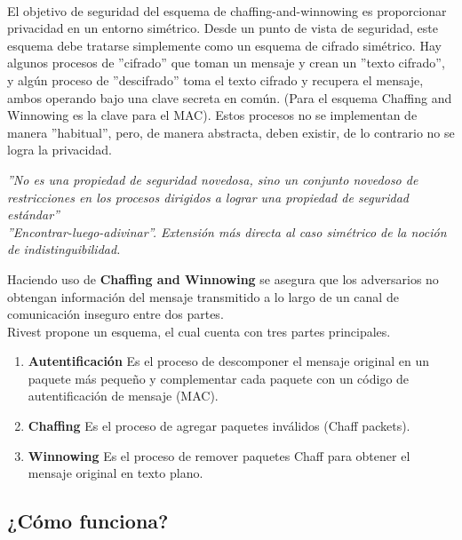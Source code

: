 \documentclass[12pt, a4paper, titlepage]{report}
\begin{document}
		\paragraph{}
		El objetivo de seguridad del esquema de chaffing-and-winnowing es proporcionar privacidad en un entorno simétrico. 
        Desde un punto de vista de seguridad, este esquema debe tratarse simplemente como un esquema de cifrado simétrico. Hay algunos procesos de ''cifrado'' que toman un mensaje y crean un ''texto cifrado'', y algún proceso de ''descifrado'' toma el texto cifrado y recupera el mensaje, ambos operando bajo una clave secreta en com\'un. (Para el esquema Chaffing and Winnowing es la clave para el MAC). Estos procesos no se implementan de manera ''habitual'', pero, de manera abstracta, deben existir, de lo contrario no se logra la privacidad.  \cite{refRivestSeguridad} \cite{refEncontrarLuegoAdivinar}  
        \begin{center}
            \textit{''No es una propiedad de seguridad novedosa, sino un conjunto novedoso de restricciones en los procesos dirigidos a lograr una propiedad de seguridad estándar''\\
            ''Encontrar-luego-adivinar''. Extensión más directa al caso simétrico de la noción de indistinguibilidad.}
        \end{center}
		
		Haciendo uso de \textbf{Chaffing and Winnowing} se asegura que los adversarios no obtengan información del mensaje transmitido a lo largo de un canal de comunicación inseguro entre dos partes. \\
		Rivest propone un esquema, el cual cuenta con tres partes principales. \cite{refChaffing}
		\begin{enumerate}
		    \item \textbf{Autentificación} Es el proceso de descomponer el mensaje original en un paquete más pequeño y complementar cada paquete con un código de autentificación de mensaje (MAC).
		    \item \textbf{Chaffing} Es el proceso de agregar paquetes inválidos (Chaff packets).
		    \item \textbf{Winnowing} Es el proceso de remover paquetes Chaff para obtener el mensaje original en texto plano.
		\end{enumerate}
		
		\subsection{¿Cómo funciona?}
		
\end{document}
